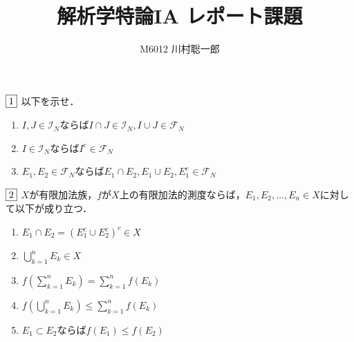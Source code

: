 \documentclass[dvipdfmx, leqno]{jsreport}
\title{解析学特論IA レポート課題}
\author{M6012 川村聡一郎}
\date{}
\begin{document}
\maketitle
\begin{tcolorbox}$\fbox{1}$
    以下を示せ．
\begin{enumerate}
    \item $I, J\in \mathcal{I}_N$ならば$I\cap J\in\mathcal{I}_N, I\cup J\in\mathcal{F}_N$
    \item $I\in \mathcal{I}_N$ならば$I^c\in \mathcal{F}_N$
    \item $E_1, E_2\in \mathcal{F}_N$ならば$E_1\cap E_2, E_1\cup E_2, E_1^c\in \mathcal{F}_N$
\end{enumerate}
\end{tcolorbox}
\begin{tcolorbox}$\fbox{2}$
    $X$が有限加法族，$f$が$X$上の有限加法的測度ならば，$E_1, E_2, \ldots, E_n\in X$に対して以下が成り立つ．
\begin{enumerate}
    \item $E_1\cap E_2= (E_1^c\cup E_2^c)^c\in X$
    \item $\bigcup_{k= 1}^n E_k\in X$
    \item $f\left(\sum_{k= 1}^n E_k\right)= \sum_{k= 1}^n f(E_k)$
    \item $f\left(\bigcup_{k= 1}^n E_k\right)\le \sum_{k= 1}^n f(E_k)$
    \item $E_1\subset E_2$ならば$f(E_1)\le f(E_2)$
\end{enumerate}
\end{tcolorbox}
\end{document}

